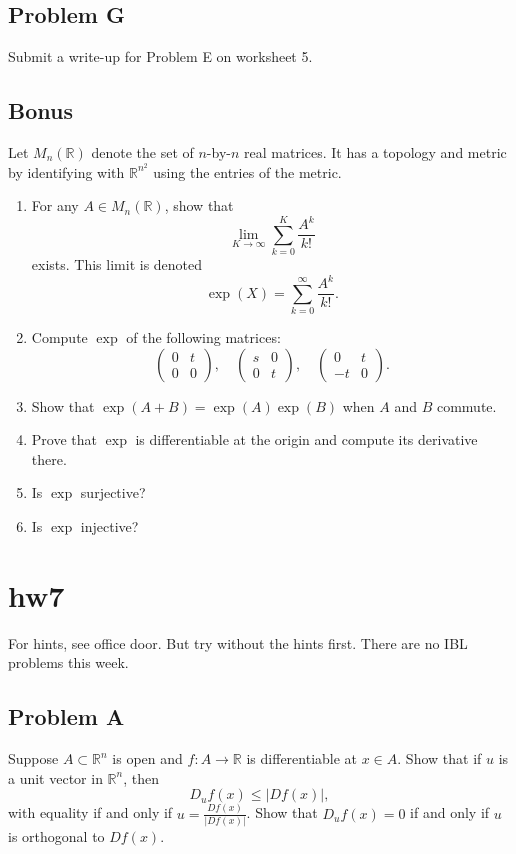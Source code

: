 \documentclass[lang=en,11pt]{template}
\begin{document}
\section*{Problem G}
Submit a write-up for Problem E on worksheet 5.

\section*{Bonus}
Let $M_n(\mathbb{R})$ denote the set of $n$-by-$n$ real matrices. It has a topology and metric by identifying with $\mathbb{R}^{n^2}$ using the entries of the metric.
\begin{enumerate}
    \item For any $A \in M_n(\mathbb{R})$, show that
    \[
    \lim_{K \to \infty} \sum_{k=0}^K \frac{A^k}{k!}
    \]
    exists. This limit is denoted
    \[
    \exp(X) = \sum_{k=0}^\infty \frac{A^k}{k!}.
    \]
    \item Compute $\exp$ of the following matrices:
    \[
    \begin{pmatrix} 0 & t \\ 0 & 0 \end{pmatrix}, \quad \begin{pmatrix} s & 0 \\ 0 & t \end{pmatrix}, \quad \begin{pmatrix} 0 & t \\ -t & 0 \end{pmatrix}.
    \]
    \item Show that $\exp(A + B) = \exp(A)\exp(B)$ when $A$ and $B$ commute.
    \item Prove that $\exp$ is differentiable at the origin and compute its derivative there.
    \item Is $\exp$ surjective?
    \item Is $\exp$ injective?
\end{enumerate}

\chapter{hw7}

For hints, see office door. But try without the hints first. There are no IBL problems this week.

\section*{Problem A}
Suppose $A \subset \mathbb{R}^n$ is open and $f : A \to \mathbb{R}$ is differentiable at $x \in A$. Show that if $u$ is a unit vector in $\mathbb{R}^n$, then
\[
D_u f(x) \leq |Df(x)|,
\]
with equality if and only if $u = \frac{Df(x)}{|Df(x)|}$. Show that $D_u f(x) = 0$ if and only if $u$ is orthogonal to $Df(x)$.
\end{document}
